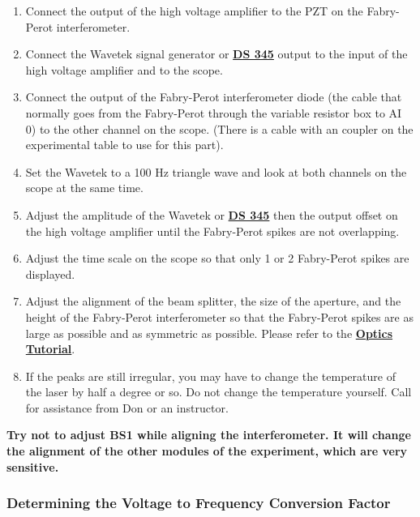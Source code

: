 \documentclass{../lab}
\begin{document}
\begin{enumerate}
    \item Connect the output of the high voltage amplifier to the PZT on the Fabry-Perot interferometer.

    \item Connect the Wavetek signal generator or \href{https://youtu.be/PrM8DHFOFS0}{\textbf{DS 345}} output to the input of the high voltage amplifier and to the scope.

    \item Connect the output of the Fabry-Perot interferometer diode (the cable that normally goes from the Fabry-Perot through the variable resistor box to AI 0) to the other channel on the scope. (There is a cable with an coupler on the experimental table to use for this part).

    \item Set the Wavetek to a 100 Hz triangle wave and look at both channels on the scope at the same time.

    \item Adjust the amplitude of the Wavetek or \href{https://youtu.be/PrM8DHFOFS0}{\textbf{\textbf{DS 345}}} then  the output offset on the high voltage amplifier until the Fabry-Perot spikes are not overlapping.

    \item Adjust the time scale on the scope so that only 1 or 2 Fabry-Perot spikes are displayed.

    \item Adjust the alignment of the beam splitter, the size of the aperture, and the height of the Fabry-Perot interferometer so that the Fabry-Perot spikes are as large as possible and as symmetric as possible. Please refer to the \href{http://experimentationlab.berkeley.edu/OpticsTutorial}{\textbf{Optics Tutorial}}.

    \item If the peaks are still irregular, you may have to change the temperature of the laser by half a degree or so. Do not change the temperature yourself. Call for assistance from Don or an instructor.

\end{enumerate}

\textbf{Try not to adjust BS1 while aligning the interferometer. It will change the alignment of the other modules of the experiment, which are very sensitive.}

\subsubsection{Determining the Voltage to Frequency Conversion Factor}
\end{document}
